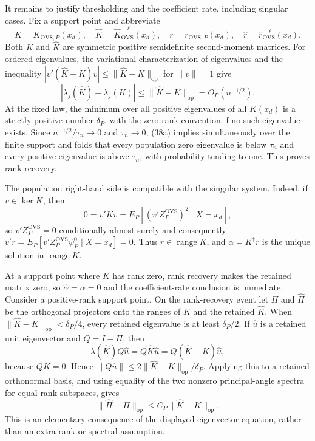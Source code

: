 It remains to justify thresholding and the coefficient rate, including singular cases.  Fix a support point and abbreviate
\[
K=K_{\mathrm{OVS},P}(x_d),\quad
\widehat K=\widehat K_{\mathrm{OVS}}^{-\ell}(x_d),\quad
r=r_{\mathrm{OVS},P}(x_d),\quad
\widehat r=\widehat r_{\mathrm{OVS}}^{-\ell}(x_d).
\]
Both \(K\) and \(\widehat K\) are symmetric positive semidefinite second-moment matrices.  For ordered eigenvalues, the variational characterization of eigenvalues and the inequality \(|v'(\widehat K-K)v|\le\|\widehat K-K\|_{\mathrm{op}}\) for \(\|v\|=1\) give
\[
|\lambda_j(\widehat K)-\lambda_j(K)|
\le\|\widehat K-K\|_{\mathrm{op}}=O_P(n^{-1/2}).
\tag{38a}
\]
At the fixed law, the minimum over all positive eigenvalues of all \(K(x_d)\) is a strictly positive number \(\delta_P\), with the zero-rank convention if no such eigenvalue exists.  Since \(n^{-1/2}/\tau_n\to0\) and \(\tau_n\to0\), (38a) implies simultaneously over the finite support and folds that every population zero eigenvalue is below \(\tau_n\) and every positive eigenvalue is above \(\tau_n\), with probability tending to one.  This proves rank recovery.

The population right-hand side is compatible with the singular system.  Indeed, if \(v\in\ker K\), then
\[
0=v'Kv=E_P[(v'Z_P^{\mathrm{OVS}})^2\mid X=x_d],
\]
so \(v'Z_P^{\mathrm{OVS}}=0\) conditionally almost surely and consequently \(v'r=E_P[v'Z_P^{\mathrm{OVS}}\psi_P^0\mid X=x_d]=0\).  Thus \(r\in\operatorname{range}K\), and \(\alpha=K^\dagger r\) is the unique solution in \(\operatorname{range}K\).

At a support point where \(K\) has rank zero, rank recovery makes the retained matrix zero, so \(\widehat\alpha=\alpha=0\) and the coefficient-rate conclusion is immediate.  Consider a positive-rank support point.  On the rank-recovery event let \(\Pi\) and \(\widehat\Pi\) be the orthogonal projectors onto the ranges of \(K\) and the retained \(\widehat K\).  When \(\|\widehat K-K\|_{\mathrm{op}}<\delta_P/4\), every retained eigenvalue is at least \(\delta_P/2\).  If \(\widehat u\) is a retained unit eigenvector and \(Q=I-\Pi\), then
\[
\lambda(\widehat K)Q\widehat u
=Q\widehat K\widehat u
=Q(\widehat K-K)\widehat u,
\]
because \(QK=0\).  Hence \(\|Q\widehat u\|\le 2\|\widehat K-K\|_{\mathrm{op}}/\delta_P\).  Applying this to a retained orthonormal basis, and using equality of the two nonzero principal-angle spectra for equal-rank subspaces, gives
\[
\|\widehat\Pi-\Pi\|_{\mathrm{op}}
\le C_P\|\widehat K-K\|_{\mathrm{op}}.
\tag{38b}
\]
This is an elementary consequence of the displayed eigenvector equation, rather than an extra rank or spectral assumption.

